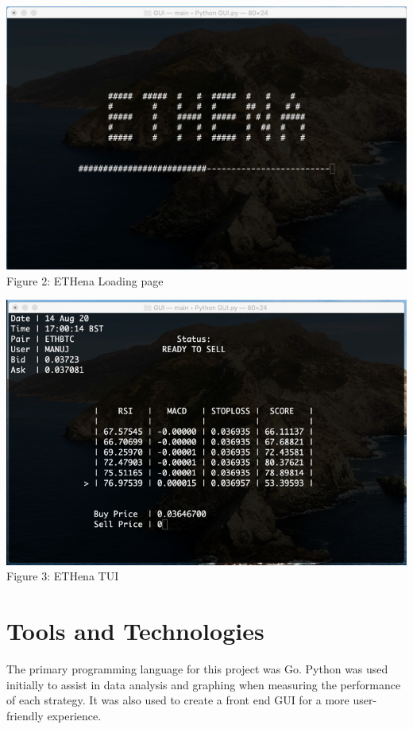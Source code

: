 \documentclass[12pt]{article}
\begin{document}
\begin{multicols}{2}
    \begin{minipage}[b]{1\linewidth}
        \includegraphics[width =\textwidth]{LoadingScreen.png}
        \centering
        Figure 2: ETHena Loading page
        \vspace{0.25cm}
    \end{minipage}
    
    \begin{minipage}[b]{1\linewidth}
        \includegraphics[width =\textwidth]{TUI.png}
        \centering
        Figure 3: ETHena TUI
    \end{minipage}

    \section{Tools and Technologies}
    The primary programming language for this project was Go. Python was used initially to assist in data analysis and graphing when measuring the performance of each strategy. It was also used to create a front end GUI for a more user-friendly experience.


\end{multicols}
\end{document}

